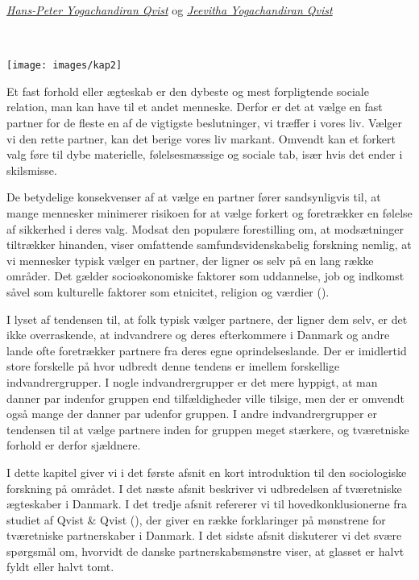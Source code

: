 \documentclass[
]{book}
\begin{document}
\thispagestyle{empty}

\emph{\href{https://vbn.aau.dk/da/persons/hpq}{Hans-Peter Yogachandiran Qvist}} og \emph{\href{https://vbn.aau.dk/da/persons/jy}{Jeevitha Yogachandiran Qvist}}

~~~~

\texttt{[image: images/kap2]}

\newpage

Et fast forhold eller ægteskab er den dybeste og mest forpligtende sociale relation, man kan have til et andet menneske. Derfor er det at vælge en fast partner for de fleste en af de vigtigste beslutninger, vi træffer i vores liv. Vælger vi den rette partner, kan det berige vores liv markant. Omvendt kan et forkert valg føre til dybe materielle, følelsesmæssige og sociale tab, især hvis det ender i skilsmisse.

De betydelige konsekvenser af at vælge en partner fører sandsynligvis til, at mange mennesker minimerer risikoen for at vælge forkert og foretrækker en følelse af sikkerhed i deres valg. Modsat den populære forestilling om, at modsætninger tiltrækker hinanden, viser omfattende samfundsvidenskabelig forskning nemlig, at vi mennesker typisk vælger en partner, der ligner os selv på en lang række områder. Det gælder socioøkonomiske faktorer som uddannelse, job og indkomst såvel som kulturelle faktorer som etnicitet, religion og værdier ().

I lyset af tendensen til, at folk typisk vælger partnere, der ligner dem selv, er det ikke overraskende, at indvandrere og deres efterkommere i Danmark og andre lande ofte foretrækker partnere fra deres egne oprindelseslande. Der er imidlertid store forskelle på hvor udbredt denne tendens er imellem forskellige indvandrergrupper. I nogle indvandrergrupper er det mere hyppigt, at man danner par indenfor gruppen end tilfældigheder ville tilsige, men der er omvendt også mange der danner par udenfor gruppen. I andre indvandrergrupper er tendensen til at vælge partnere inden for gruppen meget stærkere, og tværetniske forhold er derfor sjældnere.

I dette kapitel giver vi i det første afsnit en kort introduktion til den sociologiske forskning på området. I det næste afsnit beskriver vi udbredelsen af tværetniske ægteskaber i Danmark. I det tredje afsnit refererer vi til hovedkonklusionerne fra studiet af Qvist \& Qvist (), der giver en række forklaringer på mønstrene for tværetniske partnerskaber i Danmark. I det sidste afsnit diskuterer vi det svære spørgsmål om, hvorvidt de danske partnerskabsmønstre viser, at glasset er halvt fyldt eller halvt tomt.
\end{document}
